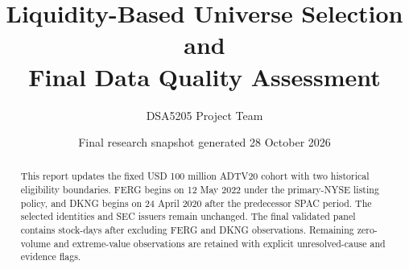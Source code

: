 \documentclass[11pt,a4paper]{article}
\title{\color{Navy}\textbf{Liquidity-Based Universe Selection and\\
Final Data Quality Assessment}}
\author{DSA5205 Project Team}
\date{Final research snapshot generated 28 October 2026}
\begin{document}
\maketitle
\begin{abstract}
This report updates the fixed USD 100 million ADTV20 cohort with two historical
eligibility boundaries. FERG begins on 12 May 2022 under the primary-NYSE
listing policy, and DKNG begins on 24 April 2020 after the predecessor SPAC
period. The \FinalSecurities{} selected identities and \FinalIssuers{} SEC
issuers remain unchanged. The final validated panel contains
\FinalObservations{} stock-days after excluding \FergExcluded{} FERG and
\DkngExcluded{} DKNG observations. Remaining zero-volume and extreme-value
observations are retained with explicit unresolved-cause and evidence flags.
\end{abstract}
\begin{center}
\end{center}
\tableofcontents
\listoffigures
\listoftables
\clearpage











\appendix



\end{document}
